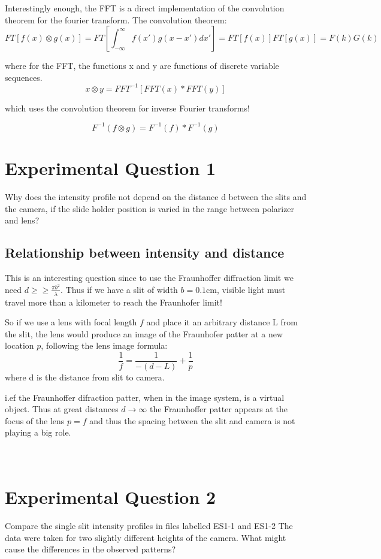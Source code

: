 \documentclass{article}
\begin{document}
Interestingly enough, the FFT is a direct implementation of the convolution theorem for the fourier transform. The convolution theorem:
$$FT[f(x) \otimes g(x)] = FT[\int_{-\infty}^{\infty} f(x')g(x-x')dx'] = FT[f(x)]FT[g(x)]=F(k)G(k) $$

where for the FFT, the functions x and y are functions of discrete variable sequences.
$$x\otimes y = FFT^{-1} [FFT(x) * FFT(y)] $$

which uses the convolution theorem for inverse Fourier transforms!

$$ F^{-1} (f\otimes g) = F^{-1}(f)* F^{-1}(g) $$


\section{Experimental Question 1}
Why does the intensity profile not depend on the distance d between the slits and the camera, if the slide holder position is varied in the range between polarizer and lens?

\subsection{Relationship between intensity and distance}
This is an interesting question since to use the Fraunhoffer diffraction limit we need $d \geq \geq \frac{\pi b^2}{\lambda} $. Thus if we have a slit of width $b = 0.1$cm, visible light must travel more than a kilometer to reach the Fraunhofer limit!

So if we use a lens with focal length $f$ and place it an arbitrary distance L from the slit, the lens would produce an image of the Fraunhofer patter at a new location $p$, following the lens image formula: $$\frac{1}{f} = \frac{1}{-(d-L)}+\frac{1}{p} $$ where d is the distance from slit to camera.

i.ef the Fraunhoffer difraction patter, when in the image system, is a virtual object. Thus at great distances $d \rightarrow \infty$ the Fraunhoffer patter appears at the focus of the lens $p = f$ and thus the spacing between the slit and camera is not playing a big role.
\\
\\
\\
\section{Experimental Question 2}
Compare the single slit intensity profiles in files labelled ES1-1 and ES1-2 The data were taken for two slightly different heights of the camera. What might cause the differences in the observed patterns?
\end{document}
